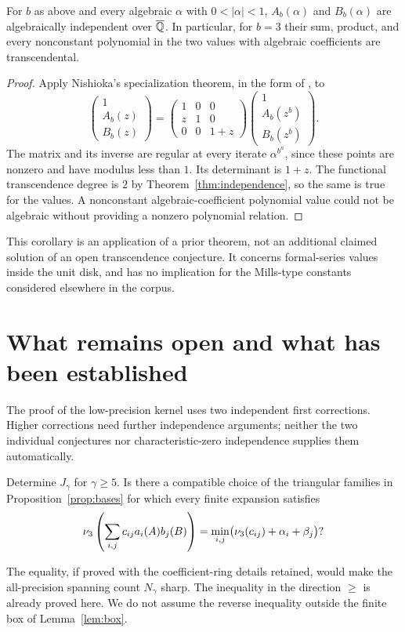\begin{corollary}\label{cor:values}
For $b$ as above and every algebraic $\alpha$ with $0<|\alpha|<1$,
$A_b(\alpha)$ and $B_b(\alpha)$ are algebraically independent over
$\overline{\mathbb Q}$. In particular, for $b=3$ their sum, product, and every
nonconstant polynomial in the two values with algebraic coefficients
are transcendental.
\end{corollary}
\begin{proof}
Apply Nishioka's specialization theorem, in the form of
\cite[Theorem~1]{AF}, to
\[
 \begin{pmatrix}1\\A_b(z)\\B_b(z)\end{pmatrix}
 =\begin{pmatrix}1&0&0\\z&1&0\\0&0&1+z\end{pmatrix}
 \begin{pmatrix}1\\A_b(z^b)\\B_b(z^b)\end{pmatrix}.
\]
The matrix and its inverse are regular at every iterate
$\alpha^{b^n}$, since these points are nonzero and have modulus less
than $1$. Its determinant is $1+z$. The functional transcendence
degree is $2$ by Theorem~\ref{thm:independence}, so the same is true
for the values. A nonconstant algebraic-coefficient polynomial value
could not be algebraic without providing a nonzero polynomial relation.
\end{proof}

This corollary is an application of a prior theorem, not an additional
claimed solution of an open transcendence conjecture. It concerns
formal-series values inside the unit disk, and has no implication for
the Mills-type constants considered elsewhere in the corpus.

\section{What remains open and what has been established}
\label{sec:open}

The proof of the low-precision kernel uses two independent first
corrections. Higher corrections need further independence arguments;
neither the two individual conjectures nor characteristic-zero
independence supplies them automatically.

\begin{question}
Determine $J_\gamma$ for $\gamma\ge5$. Is there a compatible choice
of the triangular families in Proposition~\ref{prop:bases} for which
every finite expansion satisfies
\[
 \nu_3\left(\sum_{i,j} c_{ij}a_i(A)b_j(B)\right)
 =\min_{i,j}\bigl(\nu_3(c_{ij})+\alpha_i+\beta_j\bigr)?
\]
\end{question}
The equality, if proved with the coefficient-ring details retained,
would make the all-precision spanning count $N_\gamma$ sharp. The
inequality in the direction $\ge$ is already proved here. We do not
assume the reverse inequality outside the finite box of
Lemma~\ref{lem:box}.

